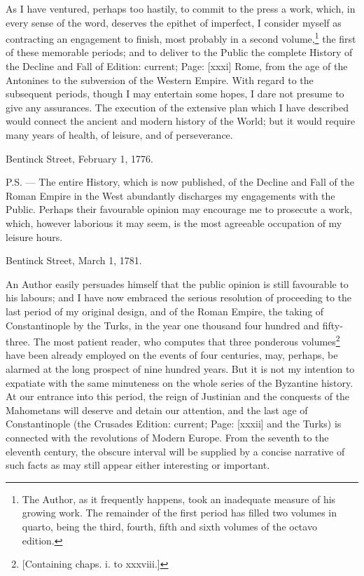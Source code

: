 As I have ventured, perhaps too hastily, to commit to the press a work, which, in every sense of the word, deserves the epithet of imperfect, I consider myself as contracting an engagement to finish, most probably in a second volume,\footnote{The Author, as it frequently happens, took an inadequate measure of his growing work. The remainder of the first period has filled two volumes in quarto, being the third, fourth, fifth and sixth volumes of the octavo edition.} the first of these memorable periods; and to deliver to the Public the complete History of the Decline and Fall of Edition: current; Page: [xxxi] Rome, from the age of the Antonines to the subversion of the Western Empire. With regard to the subsequent periods, though I may entertain some hopes, I dare not presume to give any assurances. The execution of the extensive plan which I have described would connect the ancient and modern history of the World; but it would require many years of health, of leisure, and of perseverance.

Bentinck Street, February 1, 1776.

P.S. \texthebrew{—} The entire History, which is now published, of the Decline and Fall of the Roman Empire in the West abundantly discharges my engagements with the Public. Perhaps their favourable opinion may encourage me to prosecute a work, which, however laborious it may seem, is the most agreeable occupation of my leisure hours.

Bentinck Street, March 1, 1781.

An Author easily persuades himself that the public opinion is still favourable to his labours; and I have now embraced the serious resolution of proceeding to the last period of my original design, and of the Roman Empire, the taking of Constantinople by the Turks, in the year one thousand four hundred and fifty-three. The most patient reader, who computes that three ponderous volumes\footnote{[Containing chaps. i. to xxxviii.]} have been already employed on the events of four centuries, may, perhaps, be alarmed at the long prospect of nine hundred years. But it is not my intention to expatiate with the same minuteness on the whole series of the Byzantine history. At our entrance into this period, the reign of Justinian and the conquests of the Mahometans will deserve and detain our attention, and the last age of Constantinople (the Crusades Edition: current; Page: [xxxii] and the Turks) is connected with the revolutions of Modern Europe. From the seventh to the eleventh century, the obscure interval will be supplied by a concise narrative of such facts as may still appear either interesting or important.

